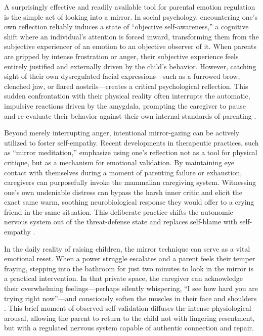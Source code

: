 A surprisingly effective and readily available tool for parental emotion regulation is the simple act of looking into a mirror.
In social psychology, encountering one's own reflection reliably induces a state of ``objective self-awareness,'' a cognitive shift where an individual's attention is forced inward, transforming them from the subjective experiencer of an emotion to an objective observer of it.
When parents are gripped by intense frustration or anger, their subjective experience feels entirely justified and externally driven by the child's behavior.
However, catching sight of their own dysregulated facial expressions---such as a furrowed brow, clenched jaw, or flared nostrils---creates a critical psychological reflection.
This sudden confrontation with their physical reality often interrupts the automatic, impulsive reactions driven by the amygdala, prompting the caregiver to pause and re-evaluate their behavior against their own internal standards of parenting \citep{duval1972}.

Beyond merely interrupting anger, intentional mirror-gazing can be actively utilized to foster self-empathy.
Recent developments in therapeutic practices, such as ``mirror meditation,'' emphasize using one's reflection not as a tool for physical critique, but as a mechanism for emotional validation.
By maintaining eye contact with themselves during a moment of parenting failure or exhaustion, caregivers can purposefully invoke the mammalian caregiving system.
Witnessing one's own undeniable distress can bypass the harsh inner critic and elicit the exact same warm, soothing neurobiological response they would offer to a crying friend in the same situation.
This deliberate practice shifts the autonomic nervous system out of the threat-defense state and replaces self-blame with self-empathy \citep{well2022}.

In the daily reality of raising children, the mirror technique can serve as a vital emotional reset.
When a power struggle escalates and a parent feels their temper fraying, stepping into the bathroom for just two minutes to look in the mirror is a practical intervention.
In that private space, the caregiver can acknowledge their overwhelming feelings---perhaps silently whispering, ``I see how hard you are trying right now''---and consciously soften the muscles in their face and shoulders \citep{well2022}.
This brief moment of observed self-validation diffuses the intense physiological arousal, allowing the parent to return to the child not with lingering resentment, but with a regulated nervous system capable of authentic connection and repair.


